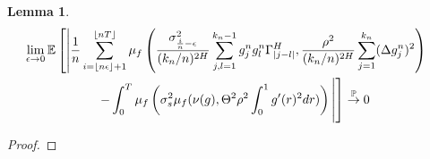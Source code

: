 \documentclass[12pt,letterpaper]{article}
\newtheorem{lemma}{Lemma}
\theoremstyle{definition}
\newcommand{\E}{\mathbb{E}}
\begin{document}
\begin{lemma}
  \begin{align}
    \phantom{}
    &\begin{aligned}
      \mathllap{} &\lim_{\epsilon \rightarrow 0}\E\left[ \left| \frac{1}{n}\sum_{i = \left\lfloor n\epsilon \right\rfloor + 1}^{\left\lfloor nT \right\rfloor}\mu_f\left( \frac{\sigma^2_{\frac{i}{n}-\epsilon}}{(k_n/n)^{2H}}\sum_{j,l = 1}^{k_n-1} g^n_jg^n_l\Gamma^H_{|j-l|}, \frac{\rho^2}{(k_n/n)^{2H}}\sum_{j=1}^{k_n}(\Delta g^n_j)^2 \right) \right.\right. \\
                  &\hspace*{2cm} \left.\left. - \int_0^T\mu_f\left(\sigma_{s}^2\mu_f(\nu(g), \Theta^2\rho^2\int_0^1g'(r)^2dr)\right) \vphantom{\E\left[ \left| \frac{1}{n}\sum_{i = \left\lfloor n\epsilon \right\rfloor + 1}^{\left\lfloor nT \right\rfloor}\mu_f\left( \frac{\sigma^2_{\frac{i}{n}-\epsilon}}{(k_n/n)^{2H}}\sum_{j,l = 1}^{k_n-1} g^n_jg^n_l\Gamma^H_{|j-l|}, \frac{\rho^2}{(k_n/n)^{2H}}\sum_{j=1}^{k_n}(\Delta g^n_j)^2 \right) \right|\right]} \right|\right] \overset{\mathbb{P}}{\rightarrow} 0
      \end{aligned}
  \end{align}
\end{lemma}

\begin{proof}
\end{proof}
\end{document}
